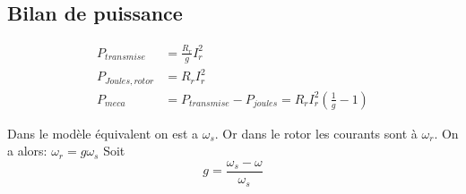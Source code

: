 \documentclass[main.tex]{subfiles}
\begin{document}
\subsection{Bilan de puissance}

\begin{align*}
  P_{transmise} &= \frac{R_r}{g}I_r^2 \\
 P_{Joules, rotor} &= R_r I_r^2 \\
 P_{meca} &= P_{transmise}-P_{joules} = R_rI_r^2(\frac{1}{g}-1)
\end{align*}

Dans le modèle équivalent on est a $\omega_s$. Or dans le rotor les courants sont à $\omega_r$. On a alors: $\omega_r =g\omega_s$ Soit
\[\boxed{
g =\frac{\omega_s-\omega}{\omega_s}
}\]
\end{document}
